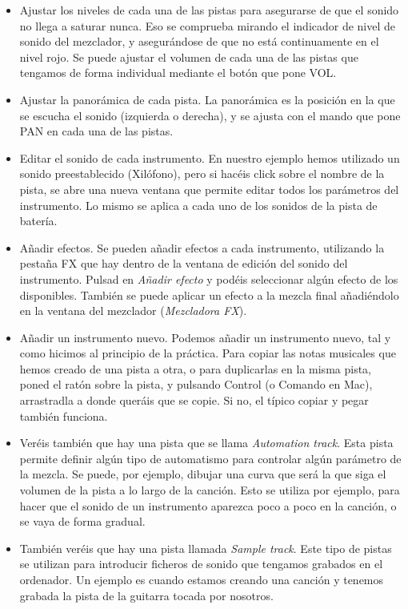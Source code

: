 \documentclass[es,practica]{uah}
\begin{document}
\begin{itemize}
\item Ajustar los niveles de cada una de las pistas para asegurarse de que el sonido no llega a saturar nunca. Eso se comprueba mirando el indicador de nivel de sonido del mezclador, y asegurándose de que no está continuamente en el nivel rojo. Se puede ajustar el volumen de cada una de las pistas que tengamos de forma individual mediante el botón que pone VOL.
\item Ajustar la panorámica de cada pista. La panorámica es la posición en la que se escucha el sonido (izquierda o derecha), y se ajusta con el mando que pone PAN en cada una de las pistas.
\item Editar el sonido de cada instrumento. En nuestro ejemplo hemos utilizado un sonido preestablecido (Xilófono), pero si hacéis click sobre el nombre de la pista, se abre una nueva ventana que permite editar todos los parámetros del instrumento. Lo mismo se aplica a cada uno de los sonidos de la pista de batería.
\item Añadir efectos. Se pueden añadir efectos a cada instrumento, utilizando la pestaña FX que hay dentro de la ventana de edición del sonido del instrumento. Pulsad en \emph{Añadir efecto} y podéis seleccionar algún efecto de los disponibles. También se puede aplicar un efecto a la mezcla final añadiéndolo en la ventana del mezclador (\emph{Mezcladora FX}).
\item Añadir un instrumento nuevo. Podemos añadir un instrumento nuevo, tal y como hicimos al principio de la práctica. Para copiar las notas musicales que hemos creado de una pista a otra, o para duplicarlas en la misma pista, poned el ratón sobre la pista, y pulsando Control (o Comando en Mac), arrastradla a donde queráis que se copie. Si no, el típico copiar y pegar también funciona. 
\item Veréis también que hay una pista que se llama \emph{Automation track}. Esta pista permite definir algún tipo de automatismo para controlar algún parámetro de la mezcla. Se puede, por ejemplo, dibujar una curva que será la que siga el volumen de la pista a lo largo de la canción. Esto se utiliza por ejemplo, para hacer que el sonido de un instrumento aparezca poco a poco en la canción, o se vaya de forma gradual. 
\item También veréis que hay una pista llamada \emph{Sample track}. Este tipo de pistas se utilizan para introducir ficheros de sonido que tengamos grabados en el ordenador. Un ejemplo es cuando estamos creando una canción y tenemos grabada la pista de la guitarra tocada por nosotros. 
\end{itemize}
\end{document}
